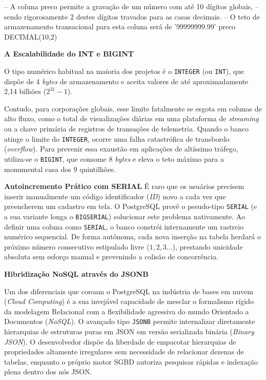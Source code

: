 \begin{sqlcode}
-- A coluna preco permite a gravação de um número com até 10 dígitos globais, 
-- sendo rigorosamente 2 destes dígitos travados para as casas decimais.
-- O teto de armazenamento transacional para esta coluna será de '99999999.99'
preco DECIMAL(10,2)
\end{sqlcode}

\vspace{0.3cm}
\noindent\textbf{A Escalabilidade do INT e BIGINT}

O tipo numérico habitual na maioria dos projetos é o \texttt{INTEGER} (ou \texttt{INT}), que dispõe de 4 \textit{bytes} de armazenamento e aceita valores de até aproximadamente 2,14 bilhões ($2^{31}-1$). 

Contudo, para corporações globais, esse limite fatalmente se esgota em colunas de alto fluxo, como o total de visualizações diárias em uma plataforma de \textit{streaming} ou a chave primária de registros de transações de telemetria. Quando o banco atinge o limite do \texttt{INTEGER}, ocorre uma falha catastrófica de transbordo (\textit{overflow}). Para prevenir essa exaustão em aplicações de altíssimo tráfego, utiliza-se o \texttt{BIGINT}, que consome 8 \textit{bytes} e eleva o teto máximo para a monumental casa dos 9 quintilhões.

\vspace{0.3cm}
\noindent\textbf{Autoincremento Prático com SERIAL}
É raro que os usuários precisem inserir manualmente um código identificador (\textit{ID}) novo a cada vez que preencherem um cadastro em tela. O PostgreSQL provê o pseudo-tipo \texttt{SERIAL} (e a sua variante longa o \texttt{BIGSERIAL}) solucionar este problema nativamente. Ao definir uma coluna como \texttt{SERIAL}, o banco constrói internamente um rastreio numérico sequencial. De forma autônoma, cada nova inserção na tabela herdará o próximo número consecutivo estipulado livre ($1, 2, 3\dots$), prestando unicidade absoluta sem esforço manual e prevenindo a colisão de concorrência.

\vspace{0.3cm}
\noindent\textbf{Hibridização NoSQL através do JSONB}

Um dos diferenciais que coroam o PostgreSQL na indústria de bases em nuvem (\textit{Cloud Computing}) é a sua invejável capacidade de mesclar o formalismo rígido da modelagem Relacional com a flexibilidade agressiva do mundo Orientado a Documentos (\textit{NoSQL}). O avançado tipo \texttt{JSONB} permite internalizar diretamente hierarquias de estruturas puras em JSON em versão serializada binária (\textit{Binary JSON}). O desenvolvedor dispõe da liberdade de empacotar hierarquias de propriedades altamente irregulares sem necessidade de relacionar dezenas de tabelas, enquanto o próprio motor SGBD autoriza pesquisas rápidas e indexação plena dentro dos nós JSON.

